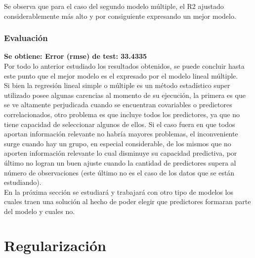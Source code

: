 Se observa que para el caso del segundo modelo múltiple, el R2 ajustado considerablemente más alto y por consiguiente expresando un mejor modelo.

\subsubsection{Evaluación}
\textbf{Se obtiene: Error (rmse) de test: 33.4335}\\


Por todo lo anterior estudiado los resultados obtenidos, se puede concluir hasta este punto que el mejor modelo es el expresado por el modelo lineal múltiple.\\


Si bien la regresión lineal simple o múltiple es un método estadístico super utilizado posee algunas carencias al momento de su ejecución, la primera es que se ve altamente perjudicada cuando se encuentran covariables o predictores correlacionados, otro problema es que incluye todos los predictores, ya que no tiene capacidad de seleccionar algunos de ellos. Si el caso fuera en que todos aportan información relevante no habría mayores problemas, el inconveniente surge cuando hay un grupo, en especial considerable, de los mismos que no aporten información relevante lo cual disminuye su capacidad predictiva, por último no logran un buen ajuste cuando la cantidad de predictores supera al número de observaciones (este último no es el caso de los datos que se están estudiando).\\
En la próxima sección se estudiará y trabajará con otro tipo de modelos los cuales traen una solución al hecho de poder elegir que predictores formaran parte del modelo y cuales no.











\section{Regularización}

